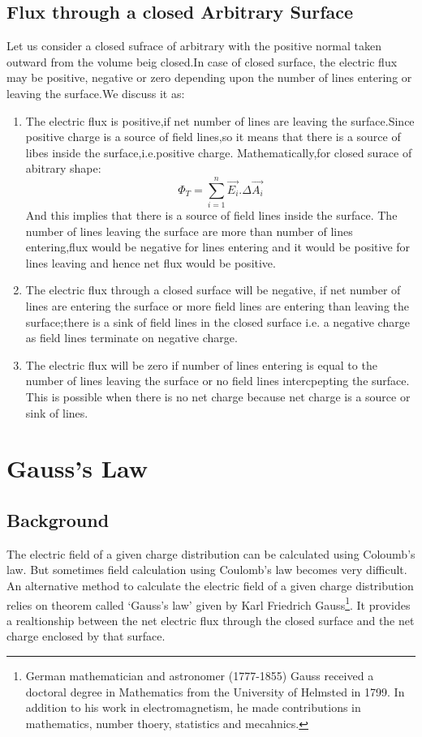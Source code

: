 \subsection{Flux through a closed Arbitrary Surface}
Let us consider a closed sufrace of arbitrary with the positive normal
taken outward from the volume beig closed.In case of closed surface,
the electric flux may be positive, negative or zero depending upon
the number of lines entering or leaving the surface.We discuss it as:

\begin{enumerate}[label=(\roman*)]
\item The electric flux is positive,if net number of lines are leaving the surface.Since positive charge is a source of field lines,so it means that there is a source of libes inside the surface,i.e.positive charge.
Mathematically,for closed surace of abitrary shape:
\begin{equation} 
  \Phi_{T} = \sum_{i=1}^{n} \vec{E_{i}}.\Delta \vec{A_{i}} \nonumber
\end{equation}
And this implies that there is a source of field lines inside the surface.
The number of lines leaving the surface are more than number of lines entering,flux would be negative for lines entering and it would be positive for lines leaving and hence net flux would be positive.
\item The electric flux through a closed surface will be negative,
if net number of lines are entering the surface or more field lines are entering than leaving the surface;there is a sink of field lines in the closed surface i.e. a negative charge as field lines terminate on negative charge.
\item The electric flux will be zero if number of lines entering is 
equal to the number of lines leaving the surface or no field lines
intercpepting the surface. This is possible when there is no net charge
because net charge is a source or sink of lines.
\end{enumerate}
\section{Gauss’s Law}
\subsection*{Background}
The electric field of a given charge distribution can be calculated
using Coloumb’s law. But sometimes field calculation using Coulomb’s law
becomes very difficult. An alternative method to calculate the electric
field of a given charge distribution relies on theorem called ‘Gauss’s law’
given by Karl Friedrich Gauss\footnote{German mathematician and astronomer (1777-1855) Gauss received a doctoral degree
in Mathematics from the University of Helmsted in 1799. In addition to his
work in electromagnetism, he made contributions in mathematics,
number thoery, statistics and mecahnics.}.
It provides a realtionship between the net electric flux
through the closed surface and the net charge enclosed by that surface.
